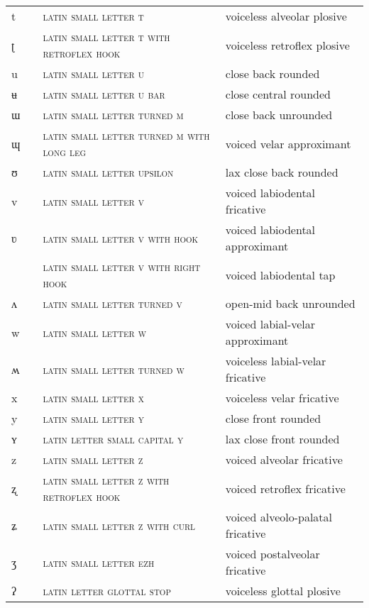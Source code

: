 \begin{center}
\begin{xtabular}{ l L{1.2cm} L{5.4cm} L{4.2cm} }
t &  & \textsc{latin small letter t} & voiceless alveolar plosive \\ 
ʈ &  & \textsc{latin small letter t with retroflex hook} & voiceless retroflex plosive \\ 
u &  & \textsc{latin small letter u} & close back rounded \\ 
ʉ &  & \textsc{latin small letter u bar} & close central rounded \\ 
ɯ &  & \textsc{latin small letter turned m} & close back unrounded \\ 
ɰ &  & \textsc{latin small letter turned m with long leg} & voiced velar approximant \\ 
ʊ &  & \textsc{latin small letter upsilon} & lax close back rounded \\ 
v &  & \textsc{latin small letter v} & voiced labiodental fricative \\ 
ʋ &  & \textsc{latin small letter v with hook} & voiced labiodental approximant \\ 
 &  & \textsc{latin small letter v with right hook} & voiced labiodental tap \\ 
ʌ &  & \textsc{latin small letter turned v} & open-mid back unrounded \\ 
w &  & \textsc{latin small letter w} & voiced labial-velar approximant \\ 
ʍ &  & \textsc{latin small letter turned w} & voiceless labial-velar fricative \\ 
x &  & \textsc{latin small letter x} & voiceless velar fricative \\ 
y &  & \textsc{latin small letter y} & close front rounded \\ 
ʏ &  & \textsc{latin letter small capital y} & lax close front rounded \\ 
z &  & \textsc{latin small letter z} & voiced alveolar fricative \\ 
ʐ &  & \textsc{latin small letter z with retroflex hook} & voiced retroflex fricative \\ 
ʑ &  & \textsc{latin small letter z with curl} & voiced alveolo-palatal fricative \\ 
ʒ &  & \textsc{latin small letter ezh} & voiced postalveolar fricative \\ 
ʔ &  & \textsc{latin letter glottal stop} & voiceless glottal plosive \\ 

\end{xtabular}
\end{center}
